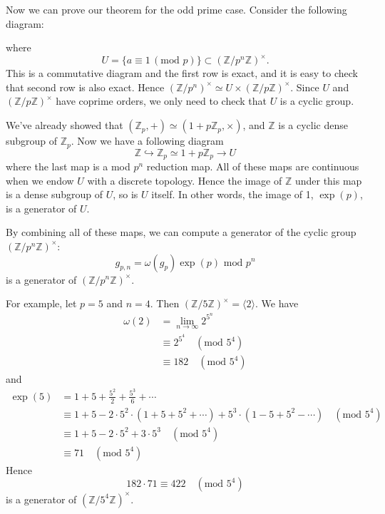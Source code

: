 \documentclass{article}
\newcommand{\Mod}[1]{(\text{mod }#1)}
\begin{document}
Now we can prove our theorem for the odd prime case. Consider the following diagram:
\begin{center}
\end{center}
where 
$$
U = \{a\equiv 1\,(\text{mod }p)\} \subset (\mathbb{Z}/p^{n}\mathbb{Z})^{\times}.
$$
This is a commutative diagram and the first row is exact, and it is easy to check that second row is also exact. Hence $(\mathbb{Z}/p^{n})^{\times} \simeq U\times (\mathbb{Z}/p\mathbb{Z})^{\times}$. 
Since $U$ and $(\mathbb{Z}/p\mathbb{Z})^{\times}$ have coprime orders, we only need to check that $U$ is a cyclic group. 

We've already showed that $(\mathbb{Z}_{p}, +)\simeq (1+p\mathbb{Z}_{p}, \times)$, and $\mathbb{Z}$ is a cyclic dense subgroup of $\mathbb{Z}_{p}$. Now we have a following diagram
$$
\mathbb{Z}\hookrightarrow \mathbb{Z}_{p} \simeq 1+p\mathbb{Z}_{p} \to U
$$
where the last map is a mod $p^{n}$ reduction map. All of these maps are continuous when we endow $U$ with a discrete topology. 
Hence the image of $\mathbb{Z}$ under this map is a dense subgroup of $U$, so is $U$ itself. In other words, the image of 1,  $\exp(p)$, is a generator of $U$. 

By combining all of these maps, we can compute a generator of the cyclic group $(\mathbb{Z}/p^{n}\mathbb{Z})^{\times}$: 
$$
g_{p, n} = \omega(g_{p})\exp(p)\text{ mod }p^{n}
$$
is a generator of $(\mathbb{Z}/p^{n}\mathbb{Z})^{\times}$. 

For example, let $p = 5$ and $n = 4$. Then $(\mathbb{Z}/5\mathbb{Z})^{\times} = \langle 2\rangle$. We have 
\begin{align*}
\omega(2) &= \lim_{n\to \infty} 2^{5^{n}} \\
&\equiv 2^{5^{4}}\quad \Mod{5^{4}} \\
&\equiv 182 \quad \Mod{5^{4}}
\end{align*}
and
\begin{align*}
\exp(5) &= 1 + 5 + \frac{5^{2}}{2} + \frac{5^{3}}{6} + \cdots  \\
&\equiv 1 + 5 - 2\cdot 5^{2}\cdot (1+5+5^{2}+\cdots) + 5^{3}\cdot(1-5+5^{2}-\cdots) \quad \Mod{5^{4}}\\
&\equiv 1 + 5 - 2\cdot 5^{2} + 3\cdot 5^{3}\quad \Mod{5^{4}} \\
&\equiv 71\quad \Mod{5^{4}}
\end{align*}
Hence 
$$
182\cdot 71 \equiv 422\quad\Mod{5^{4}}
$$
is a generator of $(\mathbb{Z}/5^{4}\mathbb{Z})^{\times}$. 
\end{document}
